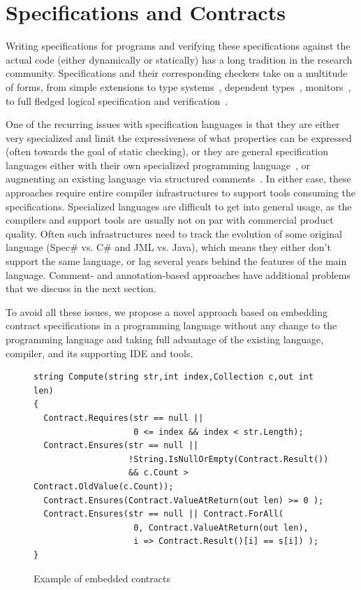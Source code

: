 \documentclass{sig-alternate}
\begin{document}
\section{Specifications and Contracts}
\noindent
Writing specifications for programs and verifying these specifications
against the actual code (either dynamically or statically) has a long
tradition in the research community. Specifications and their
corresponding checkers take on a multitude of forms, from simple
extensions to type
systems~\cite{Deline04typestatesfor,nonnull,pluggable}, dependent
types~\cite{DML}, monitors~\cite{Ball04slamand,OpalDas06}, to full
fledged logical specification and
verification~\cite{eiffel,Leavens-Baker-Ruby06,SpecSharp,vcc,Dana,adaspark}.

\noindent
One of the recurring issues with specification languages is that they
are either very specialized and limit the expressiveness of what
properties can be expressed (often towards the goal of static
checking), or they are general specification languages either with
their own specialized programming
language~\cite{eiffel,SpecSharp,vcc,Dana,adaspark}, or augmenting an
existing language via structured
comments~\cite{Leavens-Baker-Ruby06}. In either case, these approaches
require entire compiler infrastructures to support tools consuming the
specifications. Specialized languages are difficult to get into
general usage, as the compilers and support tools are usually not on
par with commercial product quality. Often such infrastructures need
to track the evolution of some original language (Spec\# vs. C\# and
JML vs. Java), which means they either don't support the same
language, or lag several years behind the features of the main
language.  Comment- and annotation-based approaches have additional
problems that we discuss in the next section.

To avoid all these issues, we propose a novel approach based on
embedding contract specifications in a programming language without
any change to the programming language and taking full advantage of
the existing language, compiler, and its supporting IDE and tools.

\begin{figure}[bt]
\begin{center}
\begin{lstlisting}
string Compute(string str,int index,Collection c,out int len)
{
  Contract.Requires(str == null ||
                    0 <= index && index < str.Length);
  Contract.Ensures(str == null ||
                   !String.IsNullOrEmpty(Contract.Result())
                   && c.Count > Contract.OldValue(c.Count));
  Contract.Ensures(Contract.ValueAtReturn(out len) >= 0 );
  Contract.Ensures(str == null || Contract.ForAll(
                    0, Contract.ValueAtReturn(out len),
                    i => Contract.Result()[i] == s[i]) );
}
\end{lstlisting}
\end{center}
\vspace*{-5mm}
\caption{Example of embedded contracts}
\label{fig:example}
\vspace*{-3mm}
\end{figure}
\end{document}
